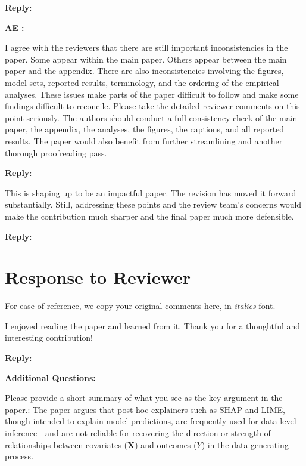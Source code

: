 \documentclass[11pt]{article}
\newcounter{se}[section]
\newcounter{aed}[section]
\newenvironment{aed}[1][]{%
    \refstepcounter{aed}\par\medskip\noindent%
    \textbf{AE \theaed: #1}\rmfamily\itshape%
}{\medskip}
\newenvironment{aed*}[1][]{%
    \par\medskip%
    \rmfamily\itshape%
}{\medskip}
\newcounter{reviewer}
\newcounter{point}[reviewer]
\newcommand{\reviewersection}{\stepcounter{reviewer} \newpage
 \section*{Response to Reviewer \thereviewer}}
\newenvironment{point*}{\bigskip \noindent \rmfamily \itshape}{\medskip} %
\newenvironment{reply}
 {\par\medskip \noindent \begin{sf}\textbf{Reply}:\ }
 {\medskip \end{sf}}
\begin{document}
\begin{reply}

\end{reply}


\begin{aed}
I agree with the reviewers that there are still important inconsistencies in the paper. Some appear within the main paper. Others appear between the main paper and the appendix. There are also inconsistencies involving the figures, model sets, reported results, terminology, and the ordering of the empirical analyses. These issues make parts of the paper difficult to follow and make some findings difficult to reconcile. Please take the detailed reviewer comments on this point seriously. The authors should conduct a full consistency check of the main paper, the appendix, the analyses, the figures, the captions, and all reported results. The paper would also benefit from further streamlining and another thorough proofreading pass.
\end{aed}

\begin{reply}

\end{reply}


\begin{aed*}
This is shaping up to be an impactful paper. The revision has moved it forward substantially. Still, addressing these points and the review team's concerns would make the contribution much sharper and the final paper much more defensible.
\end{aed*}

\begin{reply}

\end{reply}


\reviewersection{}

\textsf{For ease of reference, we copy your original comments here, in \emph{italics} font.}

\begin{point*}
I enjoyed reading the paper and learned from it. Thank you for a thoughtful and interesting contribution!
\end{point*}

\begin{reply}

\end{reply}

\noindent \textbf{Additional Questions:}

\begin{point*}
Please provide a short summary of what you see as the key argument in the paper.: The paper argues that post hoc explainers such as SHAP and LIME, though intended to explain model predictions, are frequently used for data-level inference---and are not reliable for recovering the direction or strength of relationships between covariates ($\mathbf{X}$) and outcomes ($Y$) in the data-generating process.
\end{point*}
\end{document}
